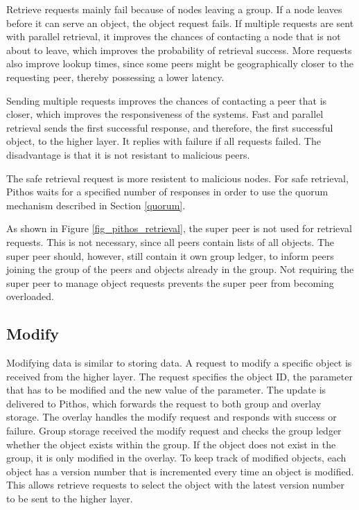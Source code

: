 Retrieve requests mainly fail because of nodes leaving a group. If a node leaves before it can serve an object, the object request fails. If multiple requests are sent with parallel retrieval, it improves the chances of contacting a node that is not about to leave, which improves the probability of retrieval success. More requests also improve lookup times, since some peers might be geographically closer to the requesting peer, thereby possessing a lower latency.

Sending multiple requests improves the chances of contacting a peer that is closer, which improves the responsiveness of the systems. Fast and parallel retrieval sends the first successful  response, and therefore, the first successful object, to the higher layer. It replies with failure if all requests failed. The disadvantage is that it is not resistant to malicious peers.

The safe retrieval request is more resistent to malicious nodes. For safe retrieval, Pithos waits for a specified number of responses in order to use the quorum mechanism described in Section \ref{quorum}.

As shown in Figure \ref{fig_pithos_retrieval}, the super peer is not used for retrieval requests. This is not necessary, since all peers contain lists of all objects. The super peer should, however, still contain it own group ledger, to inform peers joining the group of the peers and objects already in the group. Not requiring the super peer to manage object requests prevents the super peer from becoming overloaded.

\subsection{Modify}

Modifying data is similar to storing data. A request to modify a specific object is received from the higher layer. The request specifies the object ID, the parameter that has to be modified and the new value of the parameter. The update is delivered to Pithos, which forwards the request to both group and overlay storage. The overlay handles the modify request and responds with success or failure. Group storage received the modify request and checks the group ledger whether the object exists within the group. If the object does not exist in the group, it is only modified in the overlay. To keep track of modified objects, each object has a version number that is incremented every time an object is modified. This allows retrieve requests to select the object with the latest version number to be sent to the higher layer.


